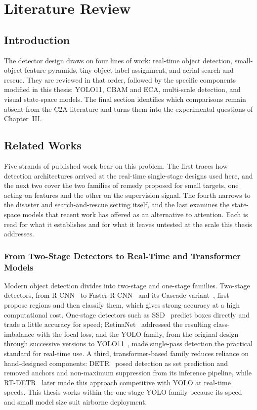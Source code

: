 \chapter{Literature Review}

\section{Introduction}
The detector design draws on four lines of work: real-time object detection,
small-object feature pyramids, tiny-object label assignment, and aerial search
and rescue. They are reviewed in that order, followed by the specific components
modified in this thesis: YOLO11, CBAM and ECA, multi-scale detection, and visual
state-space models. The final section identifies which comparisons remain absent
from the C2A literature and turns them into the experimental questions of
Chapter~III.

\section{Related Works}

Five strands of published work bear on this problem. The first traces how
detection architectures arrived at the real-time single-stage designs used here,
and the next two cover the two families of remedy proposed for small targets,
one acting on features and the other on the supervision signal. The fourth
narrows to the disaster and search-and-rescue setting itself, and the last
examines the state-space models that recent work has offered as an alternative
to attention. Each is read for what it establishes and for what it leaves
untested at the scale this thesis addresses.

\subsection{From Two-Stage Detectors to Real-Time and Transformer Models}
Modern object detection divides into two-stage and one-stage families. Two-stage
detectors, from R-CNN~\cite{girshick2014rcnn} to Faster R-CNN~\cite{ren2015fasterrcnn}
and its Cascade variant~\cite{cai2018cascade}, first propose regions and then
classify them, which gives strong accuracy at a high computational cost. One-stage
detectors such as SSD~\cite{liu2016ssd} predict boxes directly and trade a little
accuracy for speed; RetinaNet~\cite{lin2017focal} addressed the resulting
class-imbalance with the focal loss, and the YOLO family, from the original
design~\cite{redmon2016yolo} through successive versions
\cite{wang2023yolov7,
jocher2023yolov8,wang2024yolov9,wang2024yolov10}
to YOLO11~\cite{jocher2024yolo11}, made single-pass detection the practical standard
for real-time use. A third, transformer-based family reduces reliance on
hand-designed components: DETR~\cite{carion2020detr} posed detection as set
prediction and removed anchors and non-maximum suppression from its inference
pipeline, while RT-DETR~\cite{zhao2024rtdetr} later made this approach
competitive with YOLO at real-time speeds. This thesis works within the one-stage
YOLO family because its speed and small model size suit airborne deployment.

